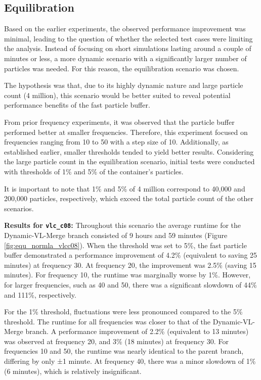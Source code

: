 \subsection{Equilibration}
 
Based on the earlier experiments, the observed performance improvement was minimal, leading to the question of whether the selected test cases were limiting the analysis. Instead of focusing on short simulations lasting around a couple of minutes or less, a more dynamic scenario with a significantly larger number of particles was needed. For this reason, the equilibration scenario was chosen.

The hypothesis was that, due to its highly dynamic nature and large particle count (4 million), this scenario would be better suited to reveal potential performance benefits of the fast particle buffer.

From prior frequency experiments, it was observed that the particle buffer performed better at smaller frequencies. Therefore, this experiment focused on frequencies ranging from 10 to 50 with a step size of 10. Additionally, as established earlier, smaller thresholds tended to yield better results. Considering the large particle count in the equilibration scenario, initial tests were conducted with thresholds of 1\% and 5\% of the container's particles. 

It is important to note that 1\% and 5\% of 4 million correspond to 40,000 and 200,000 particles, respectively, which exceed the total particle count of the other scenarios.

\textbf{Results for \texttt{vlc\_c08}:}  
Throughout this scenario the average runtime for the Dynamic-VL-Merge branch consisted of 9 hours and 59 minutes (Figure \ref{fig:equ_normla_vlcc08}). When the threshold was set to 5\%, the fast particle buffer demonstrated a performance improvement of 4.2\% (equivalent to saving 25 minutes) at frequency 30. At frequency 20, the improvement was 2.5\% (saving 15 minutes). For frequency 10, the runtime was marginally worse by 1\%. However, for larger frequencies, such as 40 and 50, there was a significant slowdown of 44\% and 111\%, respectively.

For the 1\% threshold, fluctuations were less pronounced compared to the 5\% threshold. The runtime for all frequencies was closer to that of the Dynamic-VL-Merge branch. A performance improvement of 2.2\% (equivalent to 13 minutes) was observed at frequency 20, and 3\% (18 minutes) at frequency 30. For frequencies 10 and 50, the runtime was nearly identical to the parent branch, differing by only ±1 minute. At frequency 40, there was a minor slowdown of 1\% (6 minutes), which is relatively insignificant.

